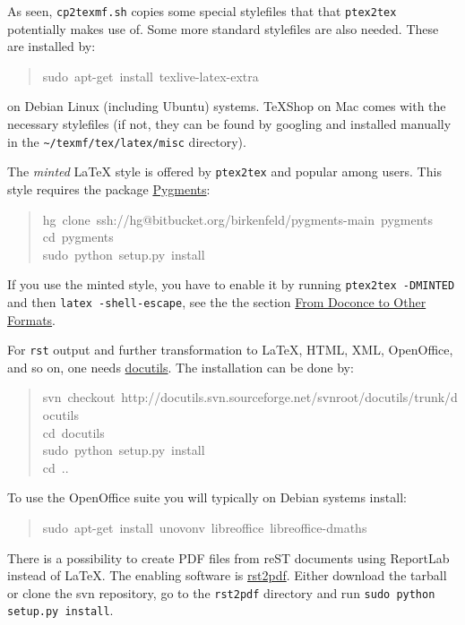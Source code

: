 \documentclass[a4paper]{article}
\begin{document}
As seen, \texttt{cp2texmf.sh} copies some special stylefiles that
that \texttt{ptex2tex} potentially makes use of. Some more standard stylefiles
are also needed. These are installed by:
%
\begin{quote}{\ttfamily \raggedright \noindent
sudo~apt-get~install~texlive-latex-extra
}
\end{quote}

on Debian Linux (including Ubuntu) systems. TeXShop on Mac comes with
the necessary stylefiles (if not, they can be found by googling and installed
manually in the \texttt{\textasciitilde{}/texmf/tex/latex/misc} directory).

The \emph{minted} LaTeX style is offered by \texttt{ptex2tex} and popular among
users. This style requires the package \href{http://pygments.org}{Pygments}:
%
\begin{quote}{\ttfamily \raggedright \noindent
hg~clone~ssh://hg@bitbucket.org/birkenfeld/pygments-main~pygments\\
cd~pygments\\
sudo~python~setup.py~install
}
\end{quote}

If you use the minted style, you have to enable it by running
\texttt{ptex2tex -DMINTED} and then \texttt{latex -shell-escape}, see
the the section \hyperref[from-doconce-to-other-formats]{From Doconce to Other Formats}.

For \texttt{rst} output and further transformation to LaTeX, HTML, XML,
OpenOffice, and so on, one needs \href{http://docutils.sourceforge.net}{docutils}.
The installation can be done by:
%
\begin{quote}{\ttfamily \raggedright \noindent
svn~checkout~http://docutils.svn.sourceforge.net/svnroot/docutils/trunk/docutils\\
cd~docutils\\
sudo~python~setup.py~install\\
cd~..
}
\end{quote}

To use the OpenOffice suite you will typically on Debian systems install:
%
\begin{quote}{\ttfamily \raggedright \noindent
sudo~apt-get~install~unovonv~libreoffice~libreoffice-dmaths
}
\end{quote}

There is a possibility to create PDF files from reST documents
using ReportLab instead of LaTeX. The enabling software is
\href{http://code.google.com/p/rst2pdf}{rst2pdf}. Either download the tarball
or clone the svn repository, go to the \texttt{rst2pdf} directory and
run \texttt{sudo python setup.py install}.
\end{document}

